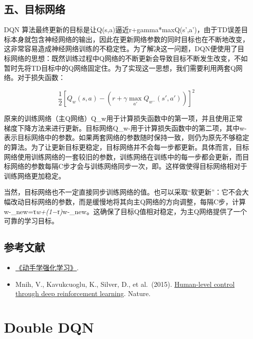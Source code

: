 \hypertarget{ux4e94ux76eeux6807ux7f51ux7edc}{%
\subsection{五、目标网络}\label{ux4e94ux76eeux6807ux7f51ux7edc}}

DQN 算法最终更新的目标是让Q(s,a)逼近r+gamma*maxQ(s',a')，由于TD误差目标本身就包含神经网络的输出，因此在更新网络参数的同时目标也在不断地改变，这非常容易造成神经网络训练的不稳定性。为了解决这一问题，DQN便使用了目标网络的思想：既然训练过程中Q网络的不断更新会导致目标不断发生改变，不如暂时先将TD目标中的Q网络固定住。为了实现这一思想，我们需要利用两套Q网络。对于损失函数：

\[
\frac{1}{2}\left[Q_w(s,a)-\left(r+\gamma\max_{a'}Q_{w^-}(s',a')\right)\right]^2
\]

原来的训练网络（主Q网络）Q\_w用于计算损失函数中的第一项，并且使用正常梯度下降方法来进行更新。目标网络Q\_w-用于计算损失函数中的第二项，其中w-表示目标网络中的参数。如果两套网络的参数随时保持一致，则仍为原先不够稳定的算法。为了让更新目标更稳定，目标网络并不会每一步都更新。具体而言，目标网络使用训练网络的一套较旧的参数，训练网络在训练中的每一步都会更新，而目标网络的参数每隔C步才会与训练网络同步一次，即。这样做使得目标网络相对于训练网络更加稳定。

当然，目标网络也不一定直接同步训练网络的值。也可以采取``软更新''：它不会大幅改动目标网络的参数，而是缓慢地将其向主Q网络的方向调整，每隔C步，计算w-\_new=τ\emph{w+(1−τ)}w-\_new。这确保了目标Q值相对稳定，为主Q网络提供了一个可靠的学习目标。

\hypertarget{ux53c2ux8003ux6587ux732e-50}{%
\subsection{参考文献}\label{ux53c2ux8003ux6587ux732e-50}}

\vspace{0.25em}
\begin{itemize}
\tightlist
\item
  \href{https://hrl.boyuai.com/}{《动手学强化学习》}.
\item
  Mnih, V., Kavukcuoglu, K., Silver, D., et al.~(2015). \href{https://www.nature.com/articles/nature14236}{Human-level control through deep reinforcement learning}. Nature.
\end{itemize}

\clearpage

\hypertarget{double-dqn}{%
\section{Double DQN}\label{double-dqn}}

